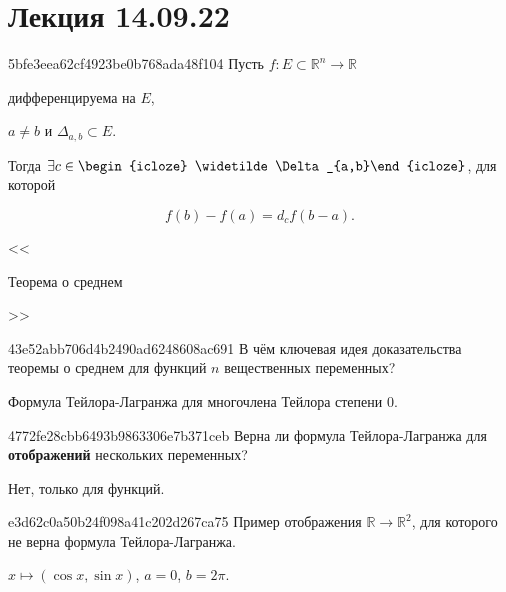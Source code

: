 \section{Лекция 14.09.22}
\begin{note}{5bfe3eea62cf4923be0b768ada48f104}
    Пусть \({ f : E \subset \mathbb R^{n} \to \mathbb R }\) \begin{icloze}{5}дифференцируема на \({ E }\),\end{icloze} \begin{icloze}{4}\({ a \neq b }\) и \({ \Delta_{a,b} \subset E }\).\end{icloze}
    Тогда \({ \exists c \in \begin{icloze}{2}\widetilde\Delta_{a,b}\end{icloze} }\), для которой
    \begin{icloze}{1}
        \[
            f(b) - f(a) = d_{c}f(b - a).
        \]
    \end{icloze}

    \begin{center}
        \tiny
        <<\begin{icloze}{3}Теорема о среднем\end{icloze}>>
    \end{center}
\end{note}

\begin{note}{43e52abb706d4b2490ad6248608ac691}
    В чём ключевая идея доказательства теоремы о среднем для функций \({ n }\) вещественных переменных?

    \begin{cloze}{1}
        Формула Тейлора-Лагранжа для многочлена Тейлора степени \({ 0 }\).
    \end{cloze}
\end{note}

\begin{note}{4772fe28cbb6493b9863306e7b371ceb}
    Верна ли формула Тейлора-Лагранжа для \textbf{отображений} нескольких переменных?

    \begin{cloze}{1}
        Нет, только для функций.
    \end{cloze}
\end{note}

\begin{note}{e3d62c0a50b24f098a41c202d267ca75}
    Пример отображения \({ \mathbb R \to \mathbb R^2 }\), для которого не верна формула Тейлора-Лагранжа.

    \begin{cloze}{1}
        \({ x \mapsto (\cos x, \sin x) }\),\: \({ a = 0 }\),\: \({ b = 2\pi }\).
    \end{cloze}
\end{note}

